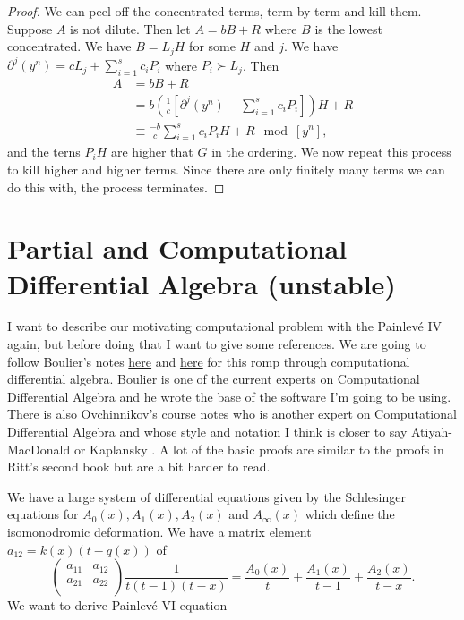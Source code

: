 \documentclass[12pt]{book}
\numberwithin{equation}{section}
\theoremstyle{definition}
\theoremstyle{remark}
\begin{document}
\begin{proof}
	We can peel off the concentrated terms, term-by-term and kill them. 
	Suppose $A$ is not dilute. 
	Then let $A=bB+R$ where $B$ is the lowest concentrated. 
	We have $B = L_j H$ for some $H$ and $j$. 
	We have $\partial^j(y^n) = cL_j + \sum_{i=1}^s c_i P_i$ where $P_i \succ L_j$. 
	Then 
	\begin{align*}
	A &= bB+R \\
	&= b \left( \frac{1}{c} \left[ \partial^j(y^n) - \sum_{i=1}^s c_i P_i \right] \right)H + R\\
	&\equiv \frac{-b}{c} \sum_{i=1}^s c_i P_i H + R \mod [y^n],
	\end{align*}
	and the terns $P_iH$ are higher that $G$ in the ordering. 
	We now repeat this process to kill higher and higher terms. 
	Since there are only finitely many terms we can do this with, the process terminates. 
\end{proof}


\chapter{Partial and Computational Differential Algebra (unstable)}\label{S:computational}

I want to describe our motivating computational problem with the Painlev\'e IV again, but before doing that I want to give some references. 
We are going to follow Boulier's notes \href{https://hal.archives-ouvertes.fr/hal-02378197v2/document}{here} and \href{https://hal.archives-ouvertes.fr/hal-00139364/document}{here} for this romp through computational differential algebra.
Boulier is one of the current experts on Computational Differential Algebra and he wrote the base of the software I'm going to be using.
There is also Ovchinnikov's \href{http://qcpages.qc.cuny.edu/~aovchinnikov/MATH87800/notes.pdf}{course notes} who is another expert on Computational Differential Algebra and whose style and notation I think is closer to say Atiyah-MacDonald \cite{Atiyah2016}
or Kaplansky \cite{Kaplansky1976}. 
A lot of the basic proofs are similar to the proofs in  Ritt's second book \cite{Ritt1950} but are a bit harder to read.


We have a large system of differential equations given by the Schlesinger equations for $A_0(x),A_1(x),A_2(x)$ and $A_{\infty}(x)$ which define the isomonodromic deformation. 
We have a matrix element $a_{12}=k(x)(t-q(x))$ of 
$$\begin{pmatrix}
a_{11} & a_{12} \\ a_{21} & a_{22} \\
\end{pmatrix} \frac{1}{t(t-1)(t-x)} = \frac{A_0(x)}{t}+\frac{A_1(x)}{t-1}+\frac{A_2(x)}{t-x}.$$
We want to derive Painlev\'e VI equation
\begin{align*}
\end{align*}
\end{document}
